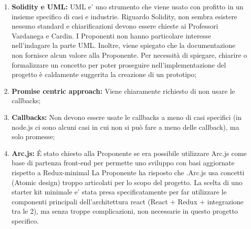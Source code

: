 \documentclass[VER-2017-11-22.tex]{subfiles}
\begin{document}
\begin{enumerate}
	\item \textbf{Solidity e UML:} UML e' uno strumento che viene usato con profitto in un insieme specifico di casi e industrie. Riguardo Solidity, non sembra esistere nessuno standard e chiarificazioni devono essere chieste ai Professori Vardanega e Cardin. I Proponenti non hanno particolare interesse nell'indagare la parte UML. Inoltre, viene spiegato che la documentazione non fornisce alcun valore alla Proponente. Per necessità di spiegare, chiarire o formalizzare un concetto per poter proseguire nell'implementazione del progetto è caldamente suggerita la creazione di un prototipo;
	\item \textbf{Promise centric approach:} Viene chiaramente richiesto di non usare le callbacks;
	\item \textbf{Callbacks:} Non devono essere usate le callbacks a meno di casi specifici (in node.js ci sono alcuni casi in cui non si può fare a meno delle callback), ma solo promesse;
	\item \textbf{Arc.js:} \'{E} stato chiesto alla Proponente se era possibile utilizzare Arc.js come base di partenza front-end per permette uno sviluppo con basi aggiornate rispetto a Redux-minimal La Proponente ha risposto che .Arc.js usa concetti (Atomic design) troppo articolati per lo scopo del progetto. La scelta di uno starter kit minimale e' stata presa specificatamente per far utilizzare le  componenti principali dell'architettura react (React + Redux + integrazione tra le 2), ma senza troppe complicazioni, non necessarie in questo progetto specifico.
\end{enumerate}
\end{document}
